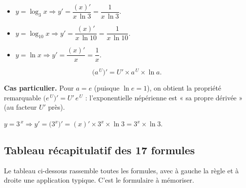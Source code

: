 \documentclass[11pt,a4paper]{article}
\begin{document}
\begin{exemple}
\begin{itemize}[leftmargin=1.5em,topsep=2pt,itemsep=5pt]
  \item $y=\log_3 x\Rightarrow y'=\dfrac{(x)'}{x\,\ln 3}=\dfrac{1}{x\,\ln 3}.$
  \item $y=\log_{10} x\Rightarrow y'=\dfrac{(x)'}{x\,\ln 10}=\dfrac{1}{x\,\ln 10}.$
  \item $y=\ln x\Rightarrow y'=\dfrac{(x)'}{x}=\dfrac{1}{x}.$
\end{itemize}
\end{exemple}

\begin{formule}
\[
   \big(a^{\,U}\big)' = U'\times a^{\,U}\times\ln a.
\]
\end{formule}
\noindent \textbf{Cas particulier.} Pour $a=e$ (puisque $\ln e=1$), on obtient la propriété
remarquable $\big(e^{\,U}\big)'=U'\,e^{\,U}$ : l'exponentielle népérienne est « sa propre dérivée »
(au facteur $U'$ près).

\begin{exemple}
$y=3^{\,x}\Rightarrow y'=\big(3^x\big)'=(x)'\times 3^x\times\ln 3 = 3^x\times\ln 3.$
\end{exemple}

\subsection{Tableau récapitulatif des 17 formules}

Le tableau ci-dessous rassemble toutes les formules, avec à gauche la règle et à droite une
application typique. C'est le formulaire à mémoriser.
\end{document}
